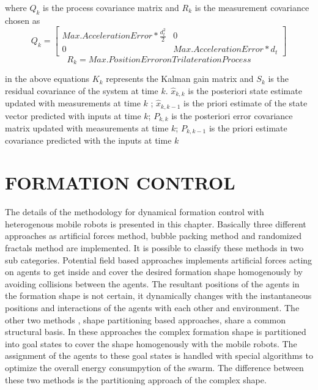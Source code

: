 \documentclass[twoside]{article}
\begin{document}
		
		where $Q_k$ is the process covariance matrix and $R_k$ is the measurement covariance chosen as 
		\begin{equation}
Q_k = \begin{bmatrix}
Max. Acceleration Error * \frac{d^2_t}{2} & 0 \\
0 & Max. Acceleration Error * d_t
\end{bmatrix}
		\end{equation}
		\begin{equation}
R_k = Max. Position Error on Trilateration Process
		\end{equation}
		
	in the above equations $K_k$ represents the Kalman gain matrix and $S_k$ is the residual covariance of the system at time $k$. $\hat{x}_{k,k}$ is the posteriori state estimate updated with measurements at time $k$ ;  $\hat{x}_{k,k-1}$ is the priori estimate of the state vector predicted with inputs at time $k$; $P_{k,k}$ is the posteriori error covariance matrix updated with measurements at time $k$; $P_{k,k-1}$ is the priori estimate covariance predicted with the inputs at time $k$
		
		
		
\section{FORMATION CONTROL}		
  The details of the methodology for dynamical formation control with heterogenous mobile robots is presented in this chapter. Basically three different approaches as artificial forces method, bubble packing method and randomized fractals method are implemented. It is possible to classify these methods in two sub categories. Potential field based approaches implements artificial forces acting on agents to get inside and cover the desired formation shape homogenously by avoiding collisions between the agents. The resultant positions of the agents in the formation shape is not certain, it dynamically changes with the instantaneous positions and interactions of the agents with each other and environment. The other two methods , shape partitioning based approaches, share a common structural basis. In these approaches the complex formation shape is partitioned into goal states to cover the shape homogenously with the mobile robots. The assignment of the agents to these goal states is handled with special algorithms to optimize the overall energy consumpytion of the swarm. The difference between these two methods is the partitioning approach of the complex shape. 
		
\end{document}

